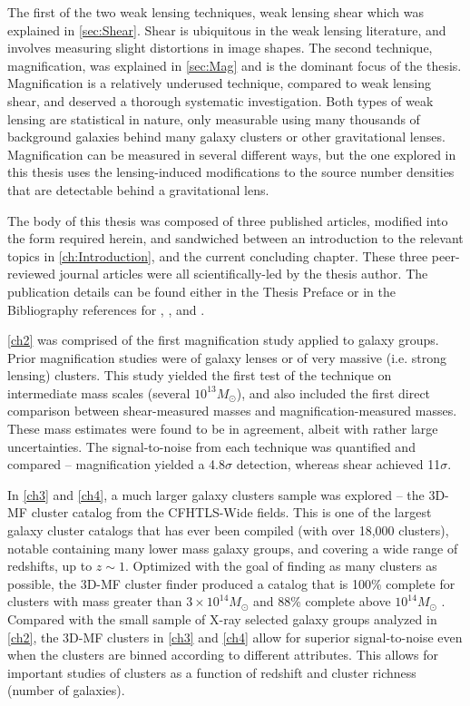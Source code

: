 The first of the two weak lensing techniques, weak lensing shear which was explained in \autoref{sec:Shear}. Shear is ubiquitous in the weak lensing literature, and involves measuring slight distortions in image shapes. The second technique, magnification, was explained in \autoref{sec:Mag} and is the dominant focus of the thesis. Magnification is a relatively underused technique, compared to weak lensing shear, and deserved a thorough systematic investigation. Both types of weak lensing are statistical in nature, only measurable using many thousands of background galaxies behind many galaxy clusters or other gravitational lenses.  Magnification can be measured in several different ways, but the one explored in this thesis uses the lensing-induced modifications to the source number densities that are detectable behind a gravitational lens.

The body of this thesis was composed of three published articles, modified into the form required herein, and sandwiched between an introduction to the relevant topics in \autoref{ch:Introduction}, and the current concluding chapter. These three peer-reviewed journal articles were all scientifically-led by the thesis author. The publication details can be found either in the Thesis Preface or in the Bibliography references for \citet{Ford12}, \citet{Ford14}, and \citet{Ford15}. 

\autoref{ch2} was comprised of the first magnification study applied to galaxy groups. Prior magnification studies were of galaxy lenses or of very massive (i.e. strong lensing) clusters. This study yielded the first test of the technique on intermediate mass scales (several $10^{13} M_{\odot}$), and also included the first direct comparison between shear-measured masses and magnification-measured masses. These mass estimates were found to be in agreement, albeit with rather large uncertainties. The signal-to-noise from each technique was quantified and compared -- magnification yielded a 4.8$\sigma$ detection, whereas shear achieved 11$\sigma$.

In \autoref{ch3} and \autoref{ch4}, a much larger galaxy clusters sample was explored -- the \ac{3D-MF} cluster catalog from the \ac{CFHTLS}-Wide fields. This is one of the largest galaxy cluster catalogs that has ever been compiled (with over 18,000 clusters), notable containing many lower mass galaxy groups, and covering a wide range of redshifts, up to $z \sim 1$. Optimized with the goal of finding as many clusters as possible, the \ac{3D-MF} cluster finder produced a catalog that is 100\% complete for clusters with mass greater than $3 \times 10^{14} M_{\odot}$ and 88\% complete above $10^{14} M_{\odot}$ \citep[see \autoref{3DMF} or the original \ac{3D-MF} paper][for more details]{Milkeraitis10}. Compared with the small sample of X-ray selected galaxy groups analyzed in \autoref{ch2}, the \ac{3D-MF} clusters in \autoref{ch3} and \autoref{ch4} allow for superior signal-to-noise even when the clusters are binned according to different attributes. This allows for important studies of clusters as a function of redshift and cluster richness (number of galaxies).

